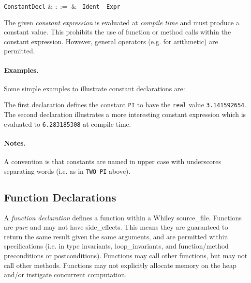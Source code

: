 \begin{syntax}
  \verb+ConstantDecl+ & $::=$ & \ \verb+Ident+\
  \ \verb+Expr+\\
\end{syntax}

The given {\em constant expression} is evaluated at {\em compile time}
and must produce a constant value.  This prohibits the use of function
or method calls within the constant expression.  However, general
operators (e.g. for arithmetic) are permitted.

\paragraph{Examples.}  Some simple examples to illustrate constant declarations are:



The first declaration defines the constant \lstinline{PI} to have the
\lstinline{real} value \lstinline{3.141592654}.  The second
declaration illustrates a more interesting constant expression which
is evaluated to \lstinline{6.283185308} at compile time.

\paragraph{Notes.}  A convention is that constants are named in upper
case with underscores separating words (i.e. as in \lstinline{TWO_PI}
above).


\subsection{Function Declarations}
\label{c_source_files_function_decl}

A {\em function declaration} defines a function within a Whiley \gls{source_file}.  Functions are {\em pure} and may not have \glspl{side_effect}.  This means they are guaranteed to return the same result given the same arguments, and are permitted within specifications (i.e. in type invariants, \gls{loop_invariant}s, and function/method \gls{precondition}s or \gls{postcondition}s).  Functions may call other functions, but may not call other methods.  Functions may not explicitly allocate memory on the heap and/or instigate concurrent computation.

